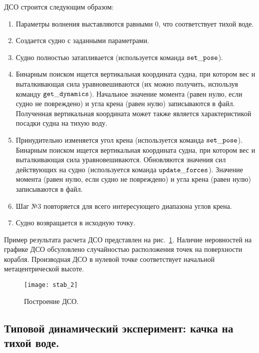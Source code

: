 ДСО строится следующим образом:
\begin{enumerate}
	\item	Параметры волнения выставляются равными 0, что соответствует тихой воде.
	\item	Создается судно с заданными параметрами.
	\item	Судно полностью затапливается (используется команда $\tt set\_pose$).
	\item	Бинарным поиском ищется вертикальная координата судна, 
			при котором вес и выталкивающая сила уравновешиваются (их можно получить, используя команду 
			$\tt get\_dynamics$). 
			Начальное значение момента (равен нулю, если судно не повреждено) и угла крена (равен нулю)
			записываются в файл. Полученная вертикальная координата может также 
			является характеристикой посадки судна на тихую воду.
	\item	Принудительно изменяется угол крена (используется команда $\tt set\_pose$). 
			Бинарным поиском ищется вертикальная координата судна, 
			при котором вес и выталкивающая сила уравновешиваются. 
			Обновляются значения сил действующих на судно (используется команда $\tt update\_forces$).
			Значение момента (равен нулю, если судно не повреждено) и угла крена (равен нулю)
			записываются в файл.
	\item	Шаг №3 повторяется для всего интересующего диапазона углов крена.
	\item	Судно возвращается в исходную точку.
\end{enumerate}

Пример результата расчета ДСО представлен на рис.~\ref{stab_2}. Наличие неровностей на графике ДСО обсуловлено случайностью расположения точек на поверхности корабля. Производная ДСО в нулевой точке соответствует начальной метацентрической высоте.


\begin{figure}[ht]
\begin{center}
\texttt{[image: stab\_2]}
\end{center}
\caption{Построение ДСО.}
\label{stab_2}
\end{figure}

\subsection{Типовой динамический эксперимент: качка на тихой воде.}


